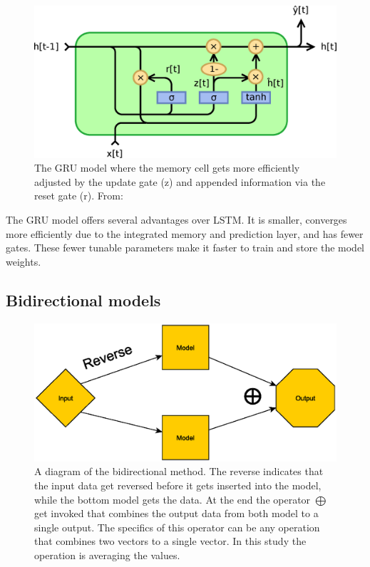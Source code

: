  
\begin{figure}[H]
	\centering
	\includegraphics[width = \textwidth]{figures/Gated_Recurrent_Unit_type_2.eps}
	\caption[GRU model sketch]{The GRU model where the memory cell gets more efficiently adjusted by the update gate (z) and appended information via the reset gate (r). From: \cite{jeblad_english_2018}}
\end{figure}

The GRU model offers several advantages over LSTM. It is smaller, converges more efficiently due to the integrated memory and prediction layer, and has fewer gates. These fewer tunable parameters make it faster to train and store the model weights.

\subsection{Bidirectional models}

\begin{figure}
	\centering
	\includegraphics[width=0.8\linewidth]{figures/Bimodel}
	\caption[Bi-directional model diargam]{A diagram of the bidirectional method. The reverse indicates that the input data get reversed before it gets inserted into the model, while the bottom model gets the data. At the end the operator $\bigoplus$ get invoked that combines the output data from both model to a single output. The specifics of this operator can be any operation that combines two vectors to a single vector. In this study the operation is averaging the values.}
	\label{fig:bimodel}
\end{figure}

